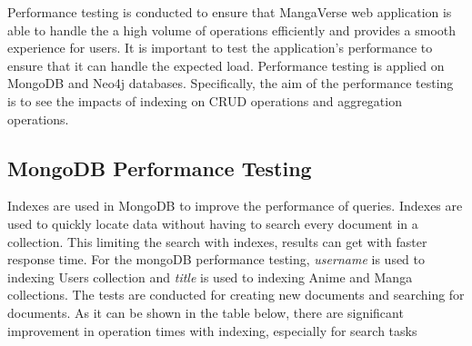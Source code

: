 Performance testing is conducted to ensure that MangaVerse web application is able to handle the 
a high volume of operations efficiently and provides a smooth experience for users. 
It is important to test the application's performance to ensure that it 
can handle the expected load. Performance testing is applied on MongoDB and Neo4j databases.
Specifically, the aim of the performance testing is to see the impacts of indexing on CRUD operations
and aggregation operations. 

\subsection*{MongoDB Performance Testing}
Indexes are used in MongoDB to improve the performance of queries. Indexes are used to quickly locate data without having to search every document in a collection.
This limiting the search with indexes, results can get with faster response time.
For the mongoDB performance testing, \textit{username} is used to indexing Users collection and \textit{title} is
used to indexing Anime and Manga collections. The tests are conducted for creating new documents and searching for documents.
As it can be shown in the table below, there are significant improvement in operation times with indexing, especially for search tasks

